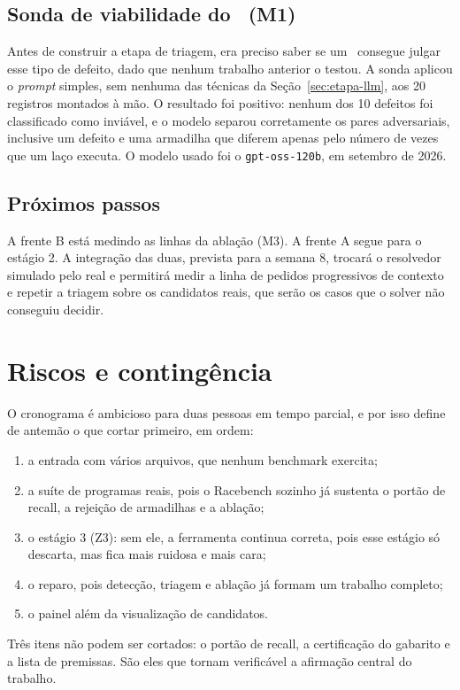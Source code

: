 \subsection{Sonda de viabilidade do \llm\ (M1)}

Antes de construir a etapa de triagem, era preciso saber se um \llm\ consegue
julgar esse tipo de defeito, dado que nenhum trabalho anterior o testou. A
sonda aplicou o \textit{prompt} simples, sem nenhuma das técnicas da
Seção~\ref{sec:etapa-llm}, aos 20 registros montados à mão. O resultado foi
positivo: nenhum dos 10 defeitos foi classificado como inviável, e o modelo
separou corretamente os pares adversariais, inclusive um defeito e uma
armadilha que diferem apenas pelo número de vezes que um laço executa. O modelo
usado foi o \texttt{gpt-oss-120b}, em setembro de 2026.

\subsection{Próximos passos}

A frente B está medindo as linhas da ablação (M3). A frente A segue para o
estágio 2. A integração das duas, prevista para a semana 8, trocará o resolvedor
simulado pelo real e permitirá medir a linha de pedidos progressivos de contexto
e repetir a triagem sobre os candidatos reais, que serão os casos que o solver
não conseguiu decidir.

\section{Riscos e contingência}
\label{sec:riscos}

O cronograma é ambicioso para duas pessoas em tempo parcial, e por isso define
de antemão o que cortar primeiro, em ordem:

\begin{enumerate}
  \item a entrada com vários arquivos, que nenhum benchmark exercita;
  \item a suíte de programas reais, pois o Racebench sozinho já sustenta o
    portão de recall, a rejeição de armadilhas e a ablação;
  \item o estágio 3 (Z3): sem ele, a ferramenta continua correta, pois esse
    estágio só descarta, mas fica mais ruidosa e mais cara;
  \item o reparo, pois detecção, triagem e ablação já formam um trabalho
    completo;
  \item o painel além da visualização de candidatos.
\end{enumerate}

Três itens não podem ser cortados: o portão de recall, a certificação do
gabarito e a lista de premissas. São eles que tornam verificável a afirmação
central do trabalho.
